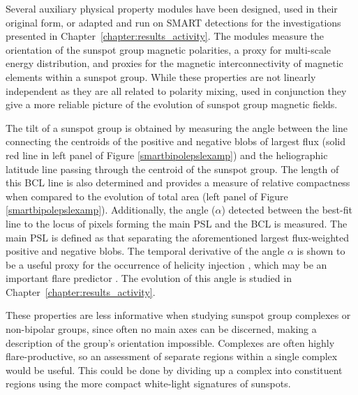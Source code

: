 Several auxiliary physical property modules have been designed, used in their original form, or adapted and run on \gls{SMART} detections for the investigations presented in Chapter~\ref{chapter:results_activity}. The modules measure the orientation of the sunspot group magnetic polarities, a proxy for multi-scale energy distribution, and proxies for the magnetic interconnectivity of magnetic elements within a sunspot group. While these properties are not linearly independent as they are all related to polarity mixing, used in conjunction they give a more reliable picture of the evolution of sunspot group magnetic fields.

The tilt of a sunspot group is obtained by measuring the angle between the line connecting the centroids of the positive and negative blobs of largest flux (solid red line in left panel of Figure \ref{smartbipolepslexamp}) and the heliographic latitude line passing through the centroid of the sunspot group. The length of this \gls{BCL} line is also  determined and provides a measure of relative compactness when compared to the evolution of total area (left panel of Figure \ref{smartbipolepslexamp}). Additionally, the angle ($\alpha$) detected between the best-fit line to the locus of pixels forming the main \gls{PSL} and the \gls{BCL} is measured. The main \gls{PSL} is defined as that separating the aforementioned largest flux-weighted positive and negative blobs. The temporal derivative of the angle $\alpha$ is shown to be a useful proxy for the occurrence of helicity injection \citep{Morita:2005}, which may be an important flare predictor \citep{LaBonte:2007}. The evolution of this angle is studied in Chapter~\ref{chapter:results_activity}. 

These properties are less informative when studying sunspot group complexes or non-bipolar groups, since often no main axes can be discerned, making a description of the group's orientation impossible. Complexes are often highly flare-productive, so an assessment of separate regions within a single complex would be useful. This could be done by dividing up a complex into constituent regions using the more compact white-light signatures of sunspots.

